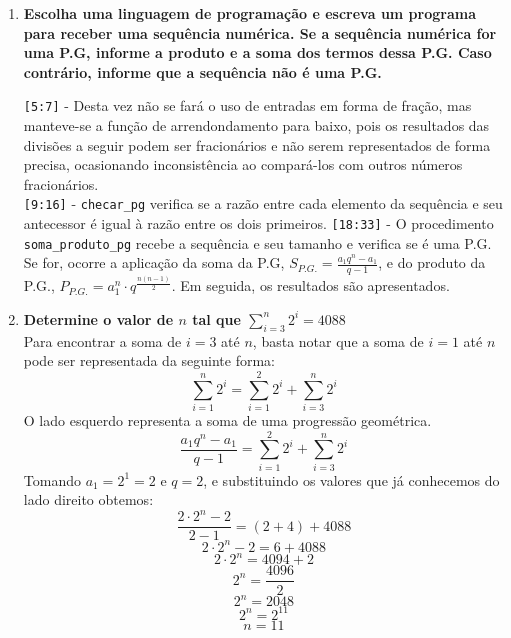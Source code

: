 \begin{enumerate}
	\item \textbf{Escolha uma linguagem de programação e escreva um programa para receber uma sequência numérica. Se a sequência numérica for uma P.G, informe a produto e a soma dos termos dessa P.G. Caso contrário, informe que a sequência não é uma P.G.}
	
	\verb|[5:7]| - Desta vez não se fará o uso de entradas em forma de fração, mas manteve-se a função de arrendondamento para baixo, pois os resultados das divisões a seguir podem ser fracionários e não serem representados de forma precisa, ocasionando inconsistência ao compará-los com outros números fracionários.\\
	\verb|[9:16]| - \verb|checar_pg| verifica se a razão entre cada elemento da sequência e seu antecessor é igual à razão entre os dois primeiros.
	\verb|[18:33]| - O procedimento \verb|soma_produto_pg| recebe a sequência e seu tamanho e verifica se é uma P.G. Se for, ocorre a aplicação da soma da P.G, $S_{P.G.} = \frac{a_1q^n-a_ 1}{q-1}$, e do produto da P.G., $P_{P.G.} = a_1^n\cdot q^{\frac{n(n-1)}{2}}$. Em seguida, os resultados são apresentados.

	\item \textbf{Determine o valor de $n$ tal que $\sum_{i=3}^n 2^i = 4088$}\\
	Para encontrar a soma de $i=3$ até $n$, basta notar que a soma de $i=1$ até $n$ pode ser representada da seguinte forma:
	$$\sum_{i=1}^{n} 2^i = \sum_{i=1}^{2} 2^i + \sum_{i=3}^{n} 2^i$$
	O lado esquerdo representa a soma de uma progressão geométrica.
	$$\frac{a_1q^n-a_1}{q-1} = \sum_{i=1}^{2} 2^i + \sum_{i=3}^{n} 2^i$$
	Tomando $a_1 = 2^1 = 2$ e $q = 2$, e substituindo os valores que já conhecemos do lado direito obtemos:
	$$\frac{2\cdot 2^n-2}{2-1} = (2+4) + 4088$$
	$$2\cdot 2^n-2 = 6 + 4088$$
	$$2\cdot2^n = 4094+2$$
	$$2^n = \frac{4096}{2}$$
	$$2^n = 2048$$
	$$2^n = 2^{11}$$
	$$n = 11$$
	
\end{enumerate}